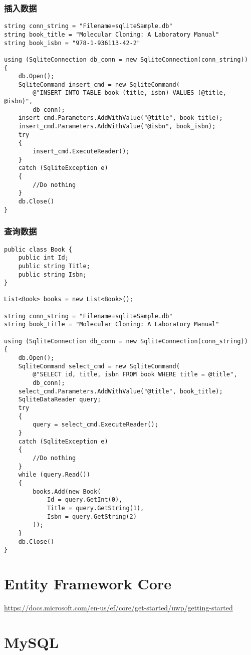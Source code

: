 \subsubsection{插入数据}

\begin{verbatim}
string conn_string = "Filename=sqliteSample.db"
string book_title = "Molecular Cloning: A Laboratory Manual"
string book_isbn = "978-1-936113-42-2"

using (SqliteConnection db_conn = new SqliteConnection(conn_string))
{
    db.Open();
    SqliteCommand insert_cmd = new SqliteCommand(
        @"INSERT INTO TABLE book (title, isbn) VALUES (@title, @isbn)",
        db_conn);
    insert_cmd.Parameters.AddWithValue("@title", book_title);
    insert_cmd.Parameters.AddWithValue("@isbn", book_isbn);
    try
    {
        insert_cmd.ExecuteReader();
    }
    catch (SqliteException e)
    {
        //Do nothing
    }
    db.Close()
}
\end{verbatim}

\subsubsection{查询数据}

\begin{verbatim}
public class Book {
    public int Id;
    public string Title;
    public string Isbn;
}

List<Book> books = new List<Book>();

string conn_string = "Filename=sqliteSample.db"
string book_title = "Molecular Cloning: A Laboratory Manual"

using (SqliteConnection db_conn = new SqliteConnection(conn_string))
{
    db.Open();
    SqliteCommand select_cmd = new SqliteCommand(
        @"SELECT id, title, isbn FROM book WHERE title = @title",
        db_conn);
    select_cmd.Parameters.AddWithValue("@title", book_title);
    SqliteDataReader query;
    try
    {
        query = select_cmd.ExecuteReader();
    }
    catch (SqliteException e)
    {
        //Do nothing
    }
    while (query.Read())
    {
        books.Add(new Book(
            Id = query.GetInt(0),
            Title = query.GetString(1),
            Isbn = query.GetString(2)
        ));
    }
    db.Close()
}
\end{verbatim}




\section{Entity Framework Core}
\url{https://docs.microsoft.com/en-us/ef/core/get-started/uwp/getting-started}


\section{MySQL}